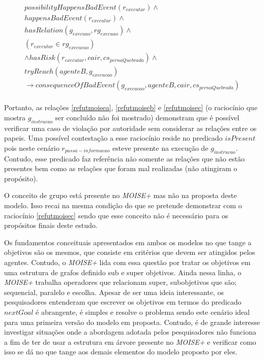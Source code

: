 \begin{eqnarray}\label{refutmoisec}
	possibilityHappensBadEvent(r_{executar}) \wedge  \nonumber \\ 
    happensBadEvent(r_{executar}) \wedge \nonumber \\ 
    hasRelation(g_{execuao},rg_{execuao}) \wedge \nonumber \\
    (r_{executar} \in rg_{execucao}) \nonumber \\ 
	\wedge hasRisk(r_{executar}, cair, cs_{pernaQuebrada}) \wedge \nonumber \\ 
    tryReach(agenteB,g_{execucao}) \nonumber \\ 
	\to consequenceOfBadEvent(g_{execucao},agenteB,cair,cs_{pernaQuebrada}) \nonumber \\ 
\end{eqnarray}

Portanto, as relações \ref{refutmoisea}, \ref{refutmoiseb} e \ref{refutmoisec} (o raciocínio que mostra $g_{instrucao}$ ser concluído não foi mostrado) 
demonstram que é possível verificar uma caso de violação por autoridade sem considerar as relações entre os papeis. Uma possível contestação a esse 
raciocínio reside no predicado $isPresent$ pois neste cenário $r_{passa-informacao}$ esteve presente na execução de $g_{instrucao}$. Contudo, esse predicado 
faz referência não somente as relações que não estão presentes bem como as relações que foram mal realizadas (não atingiram o propósito). 

O conceito de grupo está presente no \textit{MOISE+} mas não na proposta deste modelo. Isso recai na mesma condição do que se pretende demonstrar com o 
raciocínio \ref{refutmoisec} sendo que esse conceito não é necessário para os propósitos finais deste estudo. 

Os fundamentos conceituais apresentados em ambos os modelos no que tange a objetivos são os mesmos, que consiste em critérios que devem ser atingidos 
pelos agentes. Contudo, o \textit{MOISE+} lida com essa questão por tratar os objetivos em uma estrutura de grafos definido sub e super objetivos. Ainda 
nessa linha, o \textit{MOISE+} trabalha operadores que relacionam super, subobjetivos que são; sequencial, paralelo e escolha. Apesar de ser uma ideia 
interessante, os pesquisadores entenderam que escrever os objetivos em termos do predicado $nextGoal$ é abrangente, é simples e resolve o problema sendo este 
cenário ideal para uma primeira versão do modelo em proposta. Contudo, é de grande interesse investigar situações onde a abordagem adotada pelos pesquisadores 
não funciona a fim de ter de usar a estrutura em árvore presente no \textit{MOISE+} e verificar como isso se dá no que tange aos demais elementos do modelo 
proposto por eles.

